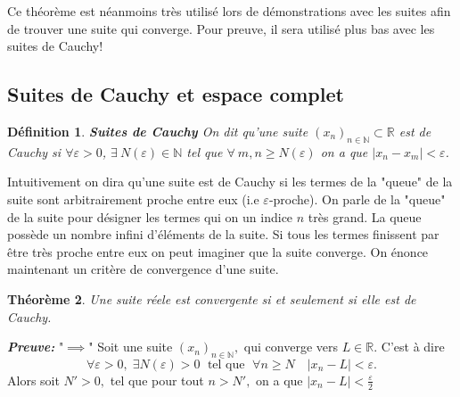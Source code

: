 \documentclass[a4paper, 12pt, french, twoside]{article}
\newtheorem{theorem}{Théorème}[section]
\newtheorem{defi}[theorem]{Définition}
\newcommand{\Nn}{{\mathbb{N}}}
\newcommand{\Rr}{{\mathbb{R}}}
\begin{document}
Ce théorème est néanmoins très utilisé lors de démonstrations avec les suites afin de trouver une suite qui converge. Pour preuve, il sera utilisé plus bas avec les suites de Cauchy!

\subsection{Suites de Cauchy et espace complet}
\begin{defi}{\textbf{Suites de Cauchy}} 
   On dit qu'une suite $(x_n)_{n \in \Nn} \subset \Rr $ est de Cauchy si $\forall \varepsilon >0 $, $\exists \: N(\varepsilon) \in \Nn $ tel que $\forall \: m,n \ge N(\varepsilon)$ on a que $|x_n - x_m| < \varepsilon$.  
\end{defi}
Intuitivement on dira qu'une suite est de Cauchy si les termes de la "queue" de la suite sont arbitrairement proche entre eux (i.e $\varepsilon$-proche).  On parle de la "queue" de la suite pour désigner les termes qui on un indice $n$ très grand. La queue possède un nombre infini d'éléments de la suite.  Si tous les termes finissent par être très proche entre eux on peut imaginer que la suite converge. On énonce maintenant un critère de convergence d'une suite. 


\begin{theorem}\label{thm420}
Une suite réele est convergente si et seulement si elle est de Cauchy.
\end{theorem}

\textit{\textbf{Preuve:}} \newline 
"$\implies$"
     Soit une suite $(x_n)_{n\in \Nn},$ qui converge vers $L\in \Rr.$ C'est à dire 
    \[
    \forall \varepsilon>0, \; \exists N(\varepsilon) >0 \; \text{ tel que } \; \forall n\geq N \quad |x_n-L|<\varepsilon.
    \]
    Alors soit $N'>0,$ tel que pour tout $n > N',$ on a que   $ |x_n - L| < \frac{\varepsilon}{2}$
\end{document}
